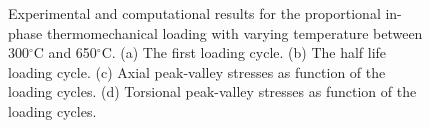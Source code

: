 

\begin{figure}[!htp]
\caption{Experimental and computational results for the proportional in-phase thermomechanical loading with varying temperature between 300$^\circ$C and 650$^\circ$C. (a) The first loading cycle. (b) The half life loading cycle. (c) Axial peak-valley stresses as function of the loading cycles. (d) Torsional peak-valley stresses as function of the loading cycles.}
\label{Fig:TMF_Prop45}
\end{figure}


